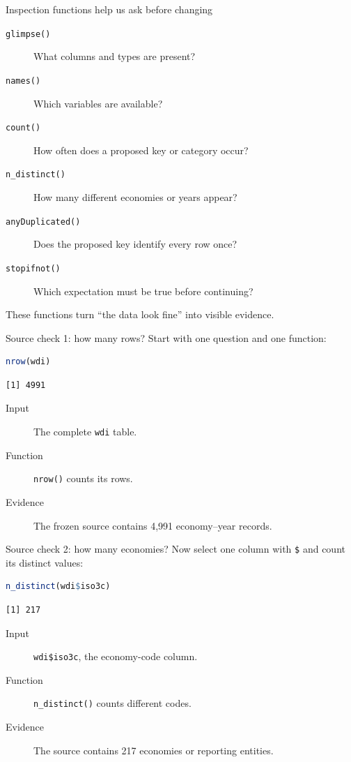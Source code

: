\begin{frame}{Inspection functions help us ask before changing}
  \begin{description}
    \item[\texttt{glimpse()}] What columns and types are present?
    \item[\texttt{names()}] Which variables are available?
    \item[\texttt{count()}] How often does a proposed key or category occur?
    \item[\texttt{n\_distinct()}] How many different economies or years appear?
    \item[\texttt{anyDuplicated()}] Does the proposed key identify every row once?
    \item[\texttt{stopifnot()}] Which expectation must be true before continuing?
  \end{description}

  \vfill
  These functions turn ``the data look fine'' into visible evidence.
\end{frame}

\begin{frame}[fragile]{Source check 1: how many rows?}
  Start with one question and one function:

\begin{lstlisting}[language=R]
nrow(wdi)
\end{lstlisting}

\begin{lstlisting}
[1] 4991
\end{lstlisting}

  \begin{description}
    \item[Input] The complete \texttt{wdi} table.
    \item[Function] \texttt{nrow()} counts its rows.
    \item[Evidence] The frozen source contains 4,991 economy--year records.
  \end{description}
\end{frame}

\begin{frame}[fragile]{Source check 2: how many economies?}
  Now select one column with \texttt{\$} and count its distinct values:

\begin{lstlisting}[language=R]
n_distinct(wdi$iso3c)
\end{lstlisting}

\begin{lstlisting}
[1] 217
\end{lstlisting}

  \begin{description}
    \item[Input] \texttt{wdi\$iso3c}, the economy-code column.
    \item[Function] \texttt{n\_distinct()} counts different codes.
    \item[Evidence] The source contains 217 economies or reporting entities.
  \end{description}
\end{frame}

